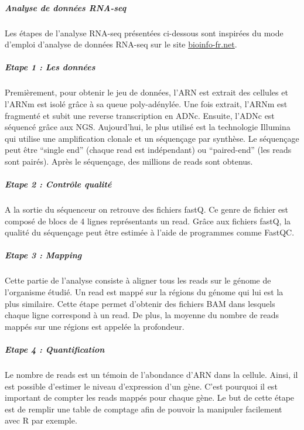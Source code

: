 \documentclass[
  12pt,
]{article}
\begin{document}
\hypertarget{analyse-de-donnuxe9es-rna-seq}{%
\subparagraph{Analyse de données
RNA-seq}\label{analyse-de-donnuxe9es-rna-seq}}

Les étapes de l'analyse RNA-seq présentées ci-dessous sont inspirées du
mode d'emploi d'analyse de données RNA-seq sur le site
\href{https://bioinfo-fr.net/lanalyse-de-donnees-rna-seq-mode-demploi}{\underline{bioinfo-fr.net}}.

\hypertarget{etape-1-les-donnuxe9es}{%
\subparagraph{Etape 1 : Les données}\label{etape-1-les-donnuxe9es}}

Premièrement, pour obtenir le jeu de données, l'ARN est extrait des
cellules et l'ARNm est isolé grâce à sa queue poly-adénylée. Une fois
extrait, l'ARNm est fragmenté et subit une reverse transcription en
ADNc. Ensuite, l'ADNc est séquencé grâce aux NGS. Aujourd'hui, le plus
utilisé est la technologie Illumina qui utilise une amplification
clonale et un séquençage par synthèse. Le séquençage peut être ``single
end'' (chaque read est indépendant) ou ``paired-end'' (les reads sont
pairés). Après le séquençage, des millions de reads sont obtenus.

\hypertarget{etape-2-contruxf4le-qualituxe9}{%
\subparagraph{Etape 2 : Contrôle
qualité}\label{etape-2-contruxf4le-qualituxe9}}

A la sortie du séquenceur on retrouve des fichiers fastQ. Ce genre de
fichier est composé de blocs de 4 lignes représentants un read. Grâce
aux fichiers fastQ, la qualité du séquençage peut être estimée à l'aide
de programmes comme FastQC.

\hypertarget{etape-3-mapping}{%
\subparagraph{Etape 3 : Mapping}\label{etape-3-mapping}}

Cette partie de l'analyse consiste à aligner tous les reads sur le
génome de l'organisme étudié. Un read est mappé sur la régions du génome
qui lui est la plus similaire. Cette étape permet d'obtenir des fichiers
BAM dans lesquels chaque ligne correspond à un read. De plus, la moyenne
du nombre de reads mappés sur une régions est appelée la profondeur.

\hypertarget{etape-4-quantification}{%
\subparagraph{Etape 4 : Quantification}\label{etape-4-quantification}}

Le nombre de reads est un témoin de l'abondance d'ARN dans la cellule.
Ainsi, il est possible d'estimer le niveau d'expression d'un gène. C'est
pourquoi il est important de compter les reads mappés pour chaque gène.
Le but de cette étape est de remplir une table de comptage afin de
pouvoir la manipuler facilement avec R par exemple.
\end{document}
